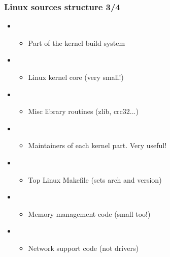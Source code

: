 \begin{frame}
  \frametitle{Linux sources structure 3/4}
  \begin{itemize}  
  \item {}
    \begin{itemize}
    \item Part of the kernel build system
    \end{itemize}
  \item {}
    \begin{itemize}
    \item Linux kernel core (very small!)
    \end{itemize}
  \item {}
    \begin{itemize}
    \item Misc library routines (zlib, crc32...)
    \end{itemize}
  \item {}
    \begin{itemize}
    \item Maintainers of each kernel part. Very useful!
    \end{itemize}
  \item {}
    \begin{itemize}
    \item Top Linux Makefile (sets arch and version)
    \end{itemize}
  \item {}
    \begin{itemize}
    \item Memory management code (small too!)
    \end{itemize}
  \item {}
    \begin{itemize}
    \item Network support code (not drivers)
    \end{itemize}
  \end{itemize}
\end{frame}

